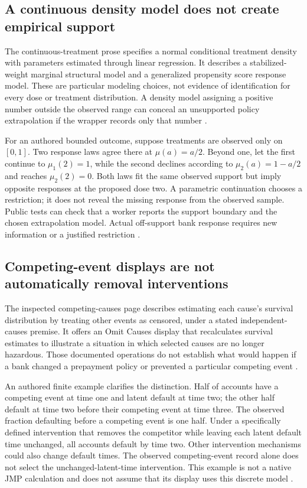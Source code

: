 \subsection{A continuous density model does not create empirical support}
The continuous-treatment prose specifies a normal conditional treatment
density with parameters estimated through linear regression. It describes
a stabilized-weight marginal structural model and a generalized propensity
score response model. These are particular modeling choices, not evidence
of identification for every dose or treatment distribution. A density
model assigning a positive number outside the observed range can conceal
an unsupported policy extrapolation if the wrapper records only that number
\citep{exec13_ch_jmp_causal,exec24_jmp_choice}.

For an authored bounded outcome, suppose treatments are observed only on
$[0,1]$. Two response laws agree there at $\mu(a)=a/2$. Beyond one, let
the first continue to $\mu_1(2)=1$, while the second declines according to
$\mu_2(a)=1-a/2$ and reaches $\mu_2(2)=0$. Both laws fit the same
observed support but imply opposite responses at the proposed dose two.
A parametric continuation chooses a restriction; it does not reveal the
missing response from the observed sample. Public tests can check that a
worker reports the support boundary and the chosen extrapolation model.
Actual off-support bank response requires new information or a justified
restriction \citep{exec24_jmp_choice}.

\subsection{Competing-event displays are not automatically removal interventions}
The inspected competing-causes page describes estimating each cause's
survival distribution by treating other events as censored, under a stated
independent-causes premise. It offers an Omit Causes display that
recalculates survival estimates to illustrate a situation in which selected
causes are no longer hazardous. Those documented operations do not establish
what would happen if a bank changed a prepayment policy or prevented a
particular competing event
\citep{exec14_survival_jmp}.

An authored finite example clarifies the distinction. Half of accounts
have a competing event at time one and latent default at time two; the
other half default at time two before their competing event at time three.
The observed fraction defaulting before a competing event is one half.
Under a specifically defined intervention that removes the competitor
while leaving each latent default time unchanged, all accounts default
by time two. Other intervention mechanisms could also change default
times. The observed competing-event record alone does not select the
unchanged-latent-time intervention. This example is not a native JMP
calculation and does not assume that its display uses this discrete model
\citep{exec24_jmp_choice}.

